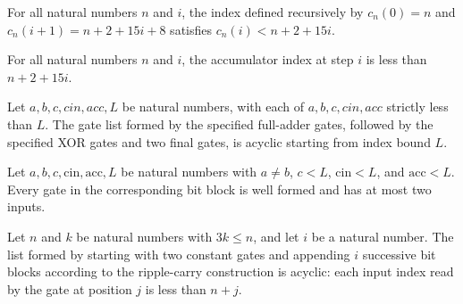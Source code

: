 \begin{theorem}
\label{BoolCircuit.cinIdx_lt}
\leanok
{}
For all natural numbers $n$ and $i$, the index defined recursively by $c_n(0)=n$ and
$c_n(i+1)=n+2+15i+8$ satisfies $c_n(i)<n+2+15i$.
\end{theorem}

\begin{theorem}
\label{BoolCircuit.accIdx_lt}
\leanok
{}
For all natural numbers $n$ and $i$, the accumulator index at step $i$ is less than
$n+2+15i$.
\end{theorem}

\begin{theorem}
\label{BoolCircuit.gatesAcyclic_bitBlock}
\leanok
{}
Let $a,b,c,cin,acc,L$ be natural numbers, with each of $a,b,c,cin,acc$ strictly less
than $L$. The gate list formed by the specified full-adder gates, followed by the
specified XOR gates and two final gates, is acyclic starting from index bound $L$.
\end{theorem}

\begin{theorem}
\label{BoolCircuit.faninTwo_bitBlock}
\leanok
{}
Let $a,b,c,\mathrm{cin},\mathrm{acc},L$ be natural numbers with $a\ne b$, $c<L$,
$\mathrm{cin}<L$, and $\mathrm{acc}<L$. Every gate in the corresponding bit block is
well formed and has at most two inputs.
\end{theorem}

\begin{theorem}
\label{BoolCircuit.gatesAcyclic_adderGatesUpTo}
\leanok
{}
Let $n$ and $k$ be natural numbers with $3k\le n$, and let $i$ be a natural number. The
list formed by starting with two constant gates and appending $i$ successive bit blocks
according to the ripple-carry construction is acyclic: each input index read by the gate
at position $j$ is less than $n+j$.
\end{theorem}

